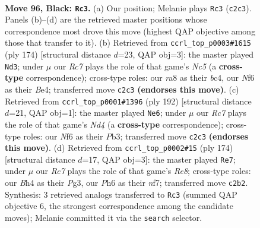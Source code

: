 \documentclass[11pt]{article}
\begin{document}
\clearpage

\begin{figure}[p]\centering
\begin{subfigure}{0.46\textwidth}\centering
\resizebox{\linewidth}{!}{%
\newchessgame
\chessboard[
  setfen={R7/8/5n1p/1K2p3/3p2kb/8/2r5/8 b - - 11 96},
  showmover=false,
  pgfstyle=straightmove, color=movearrow, markmove={c2-c3}
]}
\caption{}
\end{subfigure}\hfill
\begin{subfigure}{0.46\textwidth}\centering
\resizebox{\linewidth}{!}{%
\newchessgame
\chessboard[
  setfen={8/4k1b1/2K5/2N1p3/2b1B2P/8/8/8 w - - 7 88},
  showmover=false,
  pgfstyle=straightmove, color=movearrow, markmove={c5-d3}
]}
\caption{}
\end{subfigure}
\\[4pt]
\begin{subfigure}{0.46\textwidth}\centering
\resizebox{\linewidth}{!}{%
\newchessgame
\chessboard[
  setfen={2r5/8/8/p2K4/P2N4/1P6/5k2/8 w - - 1 97},
  showmover=false,
  pgfstyle=straightmove, color=movearrow, markmove={d4-e6}
]}
\caption{}
\end{subfigure}\hfill
\begin{subfigure}{0.46\textwidth}\centering
\resizebox{\linewidth}{!}{%
\newchessgame
\chessboard[
  setfen={4R3/5n1k/r7/8/5N2/6PK/8/8 w - - 7 88},
  showmover=false,
  pgfstyle=straightmove, color=movearrow, markmove={e8-e7}
]}
\caption{}
\end{subfigure}
\caption{\textbf{Move 96, Black: \texttt{Rc3}.} (a) Our position; Melanie plays \texttt{Rc3} (\texttt{c2c3}). Panels (b)--(d) are the retrieved master positions whose correspondence most drove this move (highest QAP objective among those that transfer to it). (b) Retrieved from \texttt{ccrl\_top\_p0003\#1615} (ply 174) [structural distance $d$=23, QAP obj=3]: the master played \texttt{Nd3}; under $\mu$ our \emph{Rc7} plays the role of that game's \emph{Nc5} (a \textbf{cross-type} correspondence); cross-type roles: our \emph{r}a8 as their \emph{b}c4, our \emph{N}f6 as their \emph{B}e4; transferred move \texttt{c2c3} \textbf{(endorses this move)}. (c) Retrieved from \texttt{ccrl\_top\_p0001\#1396} (ply 192) [structural distance $d$=21, QAP obj=1]: the master played \texttt{Ne6}; under $\mu$ our \emph{Rc7} plays the role of that game's \emph{Nd4} (a \textbf{cross-type} correspondence); cross-type roles: our \emph{N}f6 as their \emph{P}b3; transferred move \texttt{c2c3} \textbf{(endorses this move)}. (d) Retrieved from \texttt{ccrl\_top\_p0002\#15} (ply 174) [structural distance $d$=17, QAP obj=3]: the master played \texttt{Re7}; under $\mu$ our \emph{Rc7} plays the role of that game's \emph{Re8}; cross-type roles: our \emph{B}h4 as their \emph{P}g3, our \emph{P}h6 as their \emph{n}f7; transferred move \texttt{c2b2}. Synthesis: 3 retrieved analogs transferred to \texttt{Rc3} (summed QAP objective 6, the strongest correspondence among the candidate moves); Melanie committed it via the \texttt{search} selector.}
\label{fig:thought-m191}
\end{figure}
\end{document}
